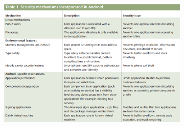 \begin{figure}[h!]
    \centering
    \includegraphics[width=0.85\textwidth]{security_table}                                                                                                                                                                                                                                                                                                                                                                                                                                                                                                                                                                                                                                                                                                                                                                                                                                                                                                                                                                                                                                                                                                                                                                                                                                                                                                                                                                                                                                                                                                                                                                                                                                                                                                                                                                                                                                                                                                                                                                                                                                                                                                                                                                                                                                                                                                                                                                                                                                                                                                                                               
\end{figure}
